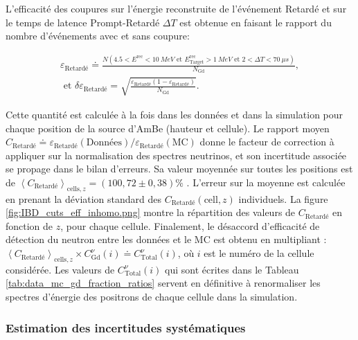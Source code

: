 L'efficacité des coupures sur l'énergie reconstruite de l'événement Retardé et sur le temps de latence Prompt-Retardé $\Delta T$ est obtenue en faisant le rapport du nombre d'événements avec et sans coupure:

\begin{equation}
\begin{gathered}
    \varepsilon_\textrm{Retardé} \doteq \frac{N\left( 4.5 < E^\textrm{rec} < \SI{10}{MeV} \textrm{ et } E^\textrm{rec}_\textrm{Target} > \SI{1}{MeV} \textrm{ et } 2 < \Delta T < \SI{70}{\mu s}  \right)}{N_\textrm{Gd}}, \\
    \textrm{ et } \delta \varepsilon_\textrm{Retardé} = \sqrt{\frac{\varepsilon_\textrm{Retardé}(1-\varepsilon_\textrm{Retardé})}{N_\textrm{Gd}}}.
\end{gathered}
\end{equation}

\bigbreak

Cette quantité est calculée à la fois dans les données et dans la simulation pour chaque position de la source d'AmBe (hauteur et cellule). Le rapport moyen $C_\textrm{Retardé} \doteq \varepsilon_\textrm{Retardé} (\textrm{Données}) / \varepsilon_\textrm{Retardé} (\textrm{MC})$ donne le facteur de correction à appliquer sur la normalisation des spectres neutrinos, et son incertitude associée se propage dans le bilan d'erreurs. Sa valeur moyennée sur toutes les positions est de $\left<C_\textrm{Retardé} \right>_{\textrm{cells},z} = (100,72 \pm 0,38) \%$ \cite{docdb945}. L'erreur sur la moyenne est calculée en prenant la déviation standard des $C_\textrm{Retardé}(\textrm{cell}, z)$ individuels. La figure \ref{fig:IBD_cuts_eff_inhomo.png} montre la répartition des valeurs de $C_\textrm{Retardé}$ en fonction de $z$, pour chaque cellule. Finalement, le désaccord d'efficacité de détection du neutron entre les données et le MC est obtenu en multipliant : $\left<C_\textrm{Retardé} \right>_{\textrm{cells},z} \times C^\nu_\textrm{Gd}(i) \doteq C^\nu_\textrm{Total}(i)$, où $i$ est le numéro de la cellule considérée. Les valeurs de $C^\nu_\textrm{Total}(i)$ qui sont écrites dans le Tableau \ref{tab:data_mc_gd_fraction_ratios} servent en définitive à renormaliser les spectres d'énergie des positrons de chaque cellule dans la simulation.\\

\subsubsection*{Estimation des incertitudes systématiques}

